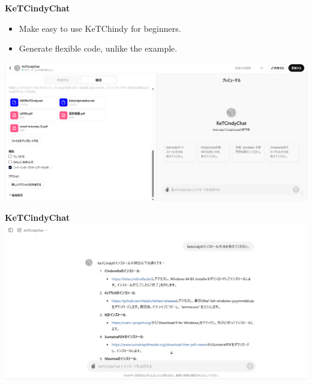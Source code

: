 \documentclass[dvipdfmx, unicode]{beamer}
\begin{document}
\begin{frame}[t]{\bfseries KeTCindyChat}
  \begin{itemize}
    \item Make easy to use KeTChindy for beginners.
    \item Generate flexible code, unlike the example.
  \end{itemize}
  \includegraphics[width=\linewidth]{img/KeTCindyChat/appaboutGPT2.png}

\end{frame}


\begin{frame}{\bfseries KeTCindyChat}
  \includegraphics[width=\linewidth]{img/KeTCindyChat/appsampleGPT.png}
\end{frame}
\end{document}
